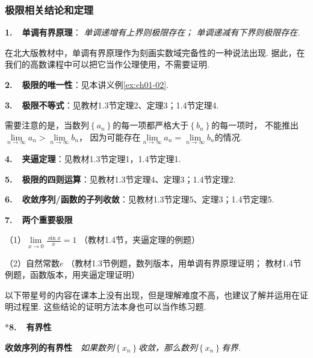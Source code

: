 \subsubsection{极限相关结论和定理}

\textbf{1.~~单调有界原理}：
\textit{单调递增有上界则极限存在；
单调递减有下界则极限存在.}

在北大版教材中，单调有界原理作为刻画实数域完备性的一种说法出现.
据此，在我们的高数课程中可以把它当作公理使用，不需要证明.\vspace{0.5em}

\textbf{2.~~极限的唯一性}：见本讲义例\ref{ex:ch01-02}.\vspace{0.5em}

\textbf{3.~~极限不等式}：见教材1.3节定理2、定理3；1.4节定理4.\vspace{0.25em}

需要注意的是，当数列$\left \{ a_{n} \right \}$的每一项都严格大于$\left \{ b_{n} \right \}$的每一项时，
不能推出$\lim\limits_{n \to \infty}a_{n} > \lim\limits_{n \to \infty}b_{n}$，
因为可能存在$\lim\limits_{n \to \infty}a_{n} = \lim\limits_{n \to \infty}b_{n}$的情况.\vspace{0.5em}

\textbf{4.~~夹逼定理}：见教材1.3节定理1，1.4节定理1.\vspace{0.5em}

\textbf{5.~~极限的四则运算}：见教材1.3节定理4、定理3；1.4节定理2.\vspace{0.5em}

\textbf{6.~~收敛序列/函数的子列收敛}：见教材1.3节定理5、定理3；1.4节定理5.\vspace{0.5em}

\textbf{7.~~两个重要极限}

（1）$\lim\limits_{x \to 0}\frac{\sin x}{x} = 1$ （教材1.4节，夹逼定理的例题）\par
（2）自然常数$e$ （教材1.3节例题，数列版本，用单调有界原理证明；
教材1.4节例题，函数版本，用夹逼定理证明）\par
\par \vspace{1em}

以下带星号的内容在课本上没有出现，但是理解难度不高，也建议了解并运用在证明过程里.
这些结论的证明方法本身也可以当作练习题.\vspace{0.5em}

*\textbf{8.~~有界性}\vspace{0.25em}

\textbf{收敛序列的有界性}~~\textit{如果数列$\left \{ x_{n} \right \}$收敛，那么数列$\left \{ x_{n} \right \}$有界.}

